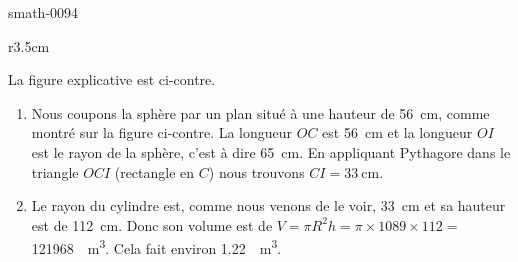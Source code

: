 
\begin{corrige}{smath-0094}


\begin{wrapfigure}{r}{3.5cm}
   \vspace{-0.5cm}        %
   \centering
   
\end{wrapfigure}

La figure explicative est ci-contre.

    \begin{enumerate}
        \item
            Nous coupons la sphère par un plan situé à une hauteur de \SI{56}{\centi\meter}, comme montré sur la figure ci-contre. La longueur \( OC\) est \SI{56}{\centi\meter} et la longueur \( OI\) est le rayon de la sphère, c'est à dire \SI{65}{\centi\meter}. En appliquant Pythagore dans le triangle \( OCI\) (rectangle en \( C\)) nous trouvons \( CI=\SI{33}{\centi\meter}\).
        \item
            Le rayon du cylindre est, comme nous venons de le voir, \SI{33}{\centi\meter} et sa hauteur est de \SI{112}{\centi\meter}. Donc son volume est de \( V=\pi R^2h=\pi\times 1089\times 112=\)\SI{121968}{\centi\cubic\meter}. Cela fait environ \SI{1.22}{\deci\cubic\meter}.
           
    \end{enumerate}

\end{corrige}
